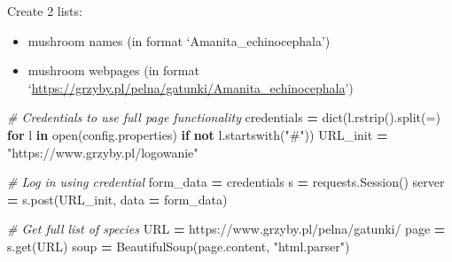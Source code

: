 \documentclass[
]{article}
\newenvironment{Shaded}{\begin{snugshade}}{\end{snugshade}}
\newcommand{\BuiltInTok}[1]{#1}
\newcommand{\CommentTok}[1]{\textcolor[rgb]{0.56,0.35,0.01}{\textit{#1}}}
\newcommand{\ControlFlowTok}[1]{\textcolor[rgb]{0.13,0.29,0.53}{\textbf{#1}}}
\newcommand{\KeywordTok}[1]{\textcolor[rgb]{0.13,0.29,0.53}{\textbf{#1}}}
\newcommand{\NormalTok}[1]{#1}
\newcommand{\OperatorTok}[1]{\textcolor[rgb]{0.81,0.36,0.00}{\textbf{#1}}}
\newcommand{\StringTok}[1]{\textcolor[rgb]{0.31,0.60,0.02}{#1}}
\begin{document}
Create 2 lists:

\begin{itemize}
\item
  mushroom names (in format `Amanita\_echinocephala')
\item
  mushroom webpages (in format
  `\url{https://grzyby.pl/pelna/gatunki/Amanita_echinocephala}')
\end{itemize}

\begin{Shaded}
\begin{Highlighting}[]
\CommentTok{\# Credentials to use full page functionality}
\NormalTok{credentials }\OperatorTok{=} \BuiltInTok{dict}\NormalTok{(l.rstrip().split(}\StringTok{\textquotesingle{}=\textquotesingle{}}\NormalTok{) }\ControlFlowTok{for}\NormalTok{ l }\KeywordTok{in} \BuiltInTok{open}\NormalTok{(}\StringTok{\textquotesingle{}config.properties\textquotesingle{}}\NormalTok{) }\ControlFlowTok{if} \KeywordTok{not}\NormalTok{ l.startswith(}\StringTok{"\#"}\NormalTok{))}
\NormalTok{URL\_init }\OperatorTok{=} \StringTok{"https://www.grzyby.pl/logowanie"}

\CommentTok{\# Log in using credential}
\NormalTok{form\_data }\OperatorTok{=}\NormalTok{ credentials}
\NormalTok{s }\OperatorTok{=}\NormalTok{ requests.Session()}
\NormalTok{server }\OperatorTok{=}\NormalTok{ s.post(URL\_init, data }\OperatorTok{=}\NormalTok{ form\_data)}

\CommentTok{\# Get full list of species}
\NormalTok{URL }\OperatorTok{=} \StringTok{\textquotesingle{}https://www.grzyby.pl/pelna/gatunki/\textquotesingle{}}
\NormalTok{page }\OperatorTok{=}\NormalTok{ s.get(URL)}
\NormalTok{soup }\OperatorTok{=}\NormalTok{ BeautifulSoup(page.content, }\StringTok{"html.parser"}\NormalTok{)}


\end{Highlighting}
\end{Shaded}
\end{document}
